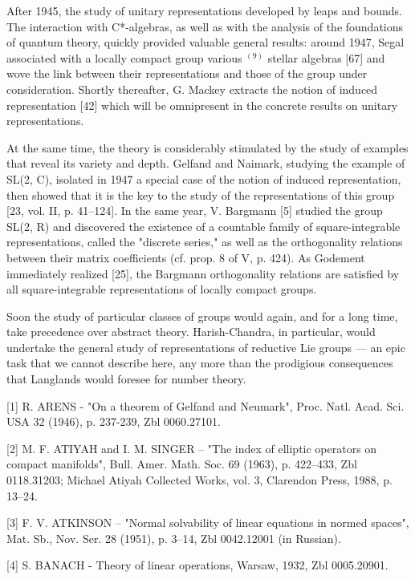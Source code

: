 After 1945, the study of unitary representations developed by leaps and bounds. The interaction with C*-algebras, as well as with the analysis of the foundations of quantum theory, quickly provided valuable general results: around 1947, Segal associated with a locally compact group various \(^{(9)}\) stellar algebras {[}67{]} and wove the link between their representations and those of the group under consideration. Shortly thereafter, G. Mackey extracts the notion of induced representation {[}42{]} which will be omnipresent in the concrete results on unitary representations.

At the same time, the theory is considerably stimulated by the study of examples that reveal its variety and depth. Gelfand and Naimark, studying the example of SL(2, C), isolated in 1947 a special case of the notion of induced representation, then showed that it is the key to the study of the representations of this group {[}23, vol. II, p. 41--124{]}. In the same year, V. Bargmann {[}5{]} studied the group SL(2, R) and discovered the existence of a countable family of square-integrable representations, called the "discrete series," as well as the orthogonality relations between their matrix coefficients (cf. prop. 8 of V, p. 424). As Godement immediately realized {[}25{]}, the Bargmann orthogonality relations are satisfied by all square-integrable representations of locally compact groups.

Soon the study of particular classes of groups would again, and for a long time, take precedence over abstract theory. Harish-Chandra, in particular, would undertake the general study of representations of reductive Lie groups --- an epic task that we cannot describe here, any more than the prodigious consequences that Langlands would foresee for number theory.


{[}1{]} R. ARENS - "On a theorem of Gelfand and Neumark", Proc. Natl. Acad. Sci. USA 32 (1946), p. 237-239, Zbl 0060.27101.

{[}2{]} M. F. ATIYAH and I. M. SINGER -- "The index of elliptic operators on compact manifolds", Bull. Amer. Math. Soc. 69 (1963), p. 422--433, Zbl 0118.31203; Michael Atiyah Collected Works, vol. 3, Clarendon Press, 1988, p. 13--24.

{[}3{]} F. V. ATKINSON -- "Normal solvability of linear equations in normed spaces", Mat. Sb., Nov. Ser. 28 (1951), p. 3--14, Zbl 0042.12001 (in Russian).

{[}4{]} S. BANACH - Theory of linear operations, Warsaw, 1932, Zbl 0005.20901.

